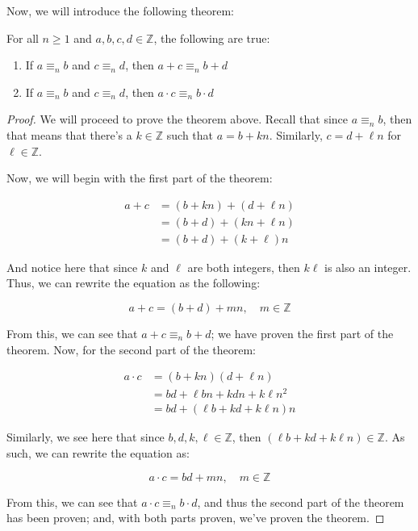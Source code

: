 \documentclass[openany]{book}
\begin{document}
Now, we will introduce the following theorem:
\begin{theorem}
	For all $n \geq 1$ and $a,b,c,d\in\mathbb{Z}$, the following are true:
	\begin{enumerate}
		\item If $a \equiv_n b$ and $c \equiv_n d$, then $a+c \equiv_n b+d$
		\item If $a \equiv_n b$ and $c \equiv_n d$, then $a \cdot c \equiv_n b \cdot d$
	\end{enumerate}
\end{theorem}
\begin{proof}
	We will proceed to prove the theorem above. Recall that since $a \equiv_n b$, then that means that there's a $k\in\mathbb{Z}$ such that $a=b+kn$. Similarly, $c=d+\ell n$ for $\ell\in\mathbb{Z}$.
	
	Now, we will begin with the first part of the theorem:
	
	\begin{align*}
		a+c&=(b+kn)+(d+\ell n) \\
		&=(b+d)+(kn+\ell n) \\
		&=(b+d)+(k+\ell)n
	\end{align*}
	
	And notice here that since $k$ and $\ell$ are both integers, then $k \ell$ is also an integer. Thus, we can rewrite the equation as the following:
	
	\begin{equation*}
		a+c=(b+d)+mn, \quad m\in\mathbb{Z}
	\end{equation*}
	
	From this, we can see that $a+c \equiv_n b+d$; we have proven the first part of the theorem. Now, for the second part of the theorem:
	
	\begin{align*}
		a \cdot c&=(b+kn)(d+\ell n) \\
		&=bd + \ell bn + kdn + k\ell n^2 \\
		&= bd + (\ell b + kd + k\ell n)n
	\end{align*}
	
	Similarly, we see here that since $b,d,k,\ell\in\mathbb{Z}$, then $(\ell b + kd + k\ell n)\in\mathbb{Z}$. As such, we can rewrite the equation as:
	
	\begin{equation*}
		a \cdot c = bd + mn, \quad m\in\mathbb{Z}
	\end{equation*}
	
	From this, we can see that $a \cdot c \equiv_n b \cdot d$, and thus the second part of the theorem has been proven; and, with both parts proven, we've proven the theorem.
\end{proof}
\end{document}
